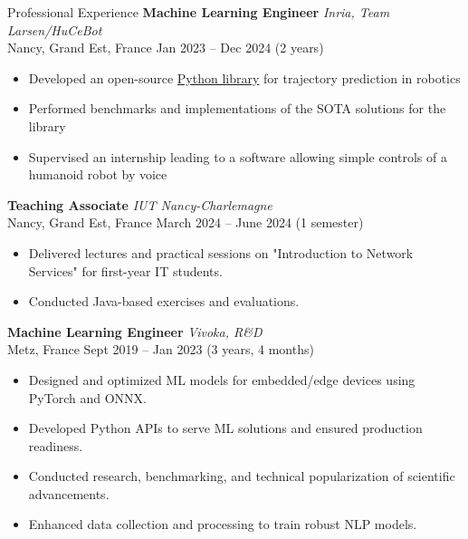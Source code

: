 \documentclass{resume} %
\begin{document}
\begin{rSection}{Professional Experience}
\textbf{Machine Learning Engineer} \hfill \textit{Inria, Team Larsen/HuCeBot} \\
Nancy, Grand Est, France \hfill Jan 2023 -- Dec 2024 (2 years)
\begin{itemize}
    \item Developed an open-source \href{https://github.com/hucebot/prescyent}{Python library} for trajectory prediction in robotics
    \item Performed benchmarks and implementations of the SOTA solutions for the library
    \item Supervised an internship leading to a software allowing simple controls of a humanoid robot by voice
\end{itemize}

\vspace{0.2cm}

\textbf{Teaching Associate} \hfill \textit{IUT Nancy-Charlemagne} \\
Nancy, Grand Est, France \hfill March 2024 -- June 2024  (1 semester)
\begin{itemize}
    \item Delivered lectures and practical sessions on "Introduction to Network Services" for first-year IT students.
    \item Conducted Java-based exercises and evaluations.
\end{itemize}

\vspace{0.2cm}

\textbf{Machine Learning Engineer} \hfill \textit{Vivoka, R\&D} \\
Metz, France \hfill Sept 2019 -- Jan 2023 (3 years, 4 months)
\begin{itemize}
    \item Designed and optimized ML models for embedded/edge devices using PyTorch and ONNX.
    \item Developed Python APIs to serve ML solutions and ensured production readiness.
    \item Conducted research, benchmarking, and technical popularization of scientific advancements.
    \item Enhanced data collection and processing to train robust NLP models.
\end{itemize}

\vspace{0.2cm}


\end{rSection}
\end{document}
